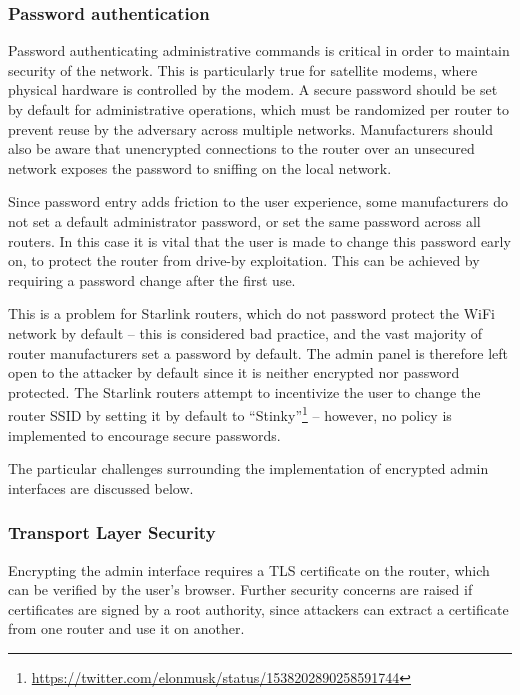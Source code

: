 \subsubsection{Password authentication}\label{sec:password_authentication}

Password authenticating administrative commands is critical in order to maintain security of the network.
This is particularly true for satellite modems, where physical hardware is controlled by the modem.
A secure password should be set by default for administrative operations, which must be randomized per router to prevent reuse by the adversary across multiple networks.
Manufacturers should also be aware that unencrypted connections to the router over an unsecured network exposes the password to sniffing on the local network.

Since password entry adds friction to the user experience, some manufacturers do not set a default administrator password, or set the same password across all routers.
In this case it is vital that the user is made to change this password early on, to protect the router from drive-by exploitation.
This can be achieved by requiring a password change after the first use.

This is a problem for Starlink routers, which do not password protect the WiFi network by default -- this is considered bad practice, and the vast majority of router manufacturers set a password by default.
The admin panel is therefore left open to the attacker by default since it is neither encrypted nor password protected.
The Starlink routers attempt to incentivize the user to change the router SSID by setting it by default to ``Stinky''\footnote{\url{https://twitter.com/elonmusk/status/1538202890258591744}} -- however, no policy is implemented to encourage secure passwords.

The particular challenges surrounding the implementation of encrypted admin interfaces are discussed below.

\subsubsection{Transport Layer Security}

Encrypting the admin interface requires a TLS certificate on the router, which can be verified by the user's browser.
Further security concerns are raised if certificates are signed by a root authority, since attackers can extract a certificate from one router and use it on another.

